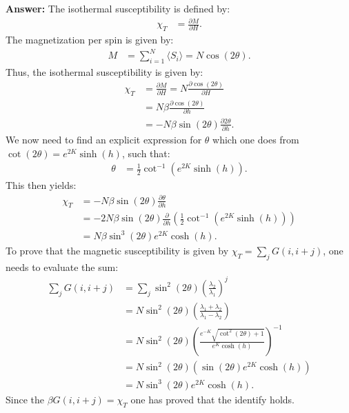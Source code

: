 \documentclass[a4paper]{article}
\newcommand{\newparagraph}{\vspace{.5cm}\noindent}
\newcommand{\fpartial}[2]{\frac{\partial #1}{\partial #2}}
\newcommand{\average}[1]{\langle #1 \rangle}
\begin{document}
\newparagraph
\textbf{Answer:} The isothermal susceptibility is defined by:
\begin{align*}
    \chi_T &= \fpartial{M}{H}.
\end{align*}The magnetization per spin is given by:
\begin{align*}
    M &= \sum_{i = 1}^N\average{S_i} = N\cos(2\theta).
\end{align*}Thus, the isothermal susceptibility is given by:
\begin{align*}
    \chi_T &= \fpartial{M}{H} = N\fpartial{\cos(2\theta)}{H}\\
    &= N\beta\fpartial{\cos(2\theta)}{h}\\
    &= -N\beta\sin(2\theta)\fpartial{2\theta}{h}.
\end{align*}We now need to find an explicit expression for $\theta$ which one does from $\cot(2\theta) = e^{2K}\sinh(h)$, such that:
\begin{align*}
    \theta &= \frac{1}{2}\cot^{-1}\left(e^{2K}\sinh(h)\right).
\end{align*}This then yields:
\begin{align*}
    \chi_T &=-N\beta\sin(2\theta)\fpartial{\theta}{h}\\
    &= -2N\beta\sin\left(2\theta\right)\fpartial{}{h}\left(\frac{1}{2}\cot^{-1}\left(e^{2K}\sinh(h)\right)\right)\\
    &= N\beta\sin^3\left(2\theta\right)e^{2K}\cosh(h).
\end{align*}
To prove that the magnetic susceptibility is given by $\chi_T = \sum_j G(i, i+j)$, one needs to evaluate the sum:
\begin{align*}
    \sum_j G(i, i+j) &= \sum_j \sin^2\left(2\theta\right)\left(\frac{\lambda_2}{\lambda_1}\right)^j\\
    &= N\sin^2\left(2\theta\right)\left(\frac{\lambda_1 + \lambda_2}{\lambda_1 - \lambda_2}\right)\\
    &= N\sin^2\left(2\theta\right)\left(\frac{e^{-K}\sqrt{\cot^2(2\theta) + 1}}{e^{K}\cosh(h)}\right)^{-1}\\
    &= N\sin^2\left(2\theta\right)\left(\sin(2\theta)e^{2K}\cosh(h)\right)\\
    &= N\sin^3\left(2\theta\right)e^{2K}\cosh(h).
\end{align*}Since the $\beta G(i, i+j) = \chi_T$ one has proved that the identify holds.
\end{document}
